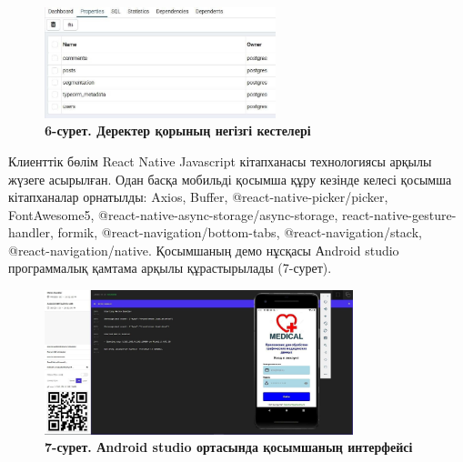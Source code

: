 \begin{figure}[H]
	\centering
	\includegraphics[width=0.6\textwidth]{assets/197}
	\caption*{\bfseries 6-сурет. Деректер қорының негізгі кестелері}
\end{figure}

\begin{multicols}{2}


Клиенттік бөлім React Native Javascript кітапханасы технологиясы арқылы
жүзеге асырылған. Одан басқа мобильді қосымша құру кезінде келесі
қосымша кітапханалар орнатылды: Axios, Buffer,
@react-native-picker/picker, FontAwesome5,
@react-native-async-storage/async-storage, react-native-gesture-handler,
formik, @react-navigation/bottom-tabs, @react-navigation/stack,
@react-navigation/native. Қосымшаның демо нұсқасы Аndroid studio
программалық қамтама арқылы құрастырылады (7-сурет).
\end{multicols}

\begin{figure}[H]
	\centering
	\includegraphics[width=0.8\textwidth]{assets/198}
	\caption*{\bfseries 7-сурет. Аndroid studio ортасында қосымшаның интерфейсі}
\end{figure}


